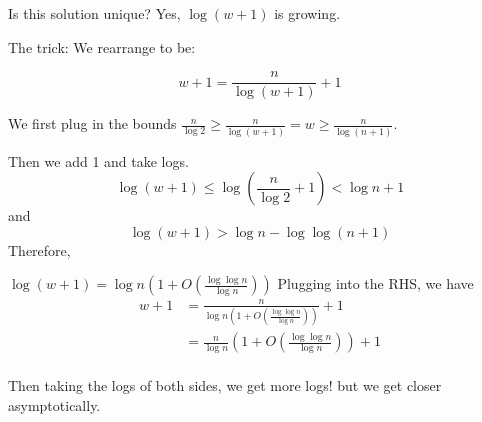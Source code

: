 \documentclass[]{article}
\theoremstyle{definition}
\numberwithin{theorem}{section}
\numberwithin{equation}{section}
\begin{document}
Is this solution unique? Yes, $\log(w + 1)$ is growing. 

The trick: We rearrange to be:

\begin{equation}
	w + 1 = \frac{n}{\log( w + 1 )} + 1
\end{equation}

We first plug in the bounds $\frac{n}{\log 2} \geq \frac{n}{\log(w + 1)} = w \geq \frac{n}{\log(n + 1)}$. 

Then we add 1 and take logs.
\begin{equation}
	\log(w + 1) \leq \log(\frac{n}{\log 2} + 1) < \log n + 1
\end{equation}
and
\begin{equation}
	\log(w + 1) > \log n - \log \log (n + 1)
\end{equation}
Therefore, 

$\log(w + 1) = \log n (1 + O(\frac{\log \log n}{\log n}))$
Plugging into the RHS, we have
\begin{align*}
	w + 1 &= \frac{n}{\log n(1 + O(\frac{\log \log n}{\log n}))} + 1\\
	&= \frac{n}{\log n}\left(1 + O(\frac{\log \log n}{\log n})\right) + 1\\
\end{align*}

Then taking the logs of both sides, we get more logs! but we get closer asymptotically.
\end{document}
